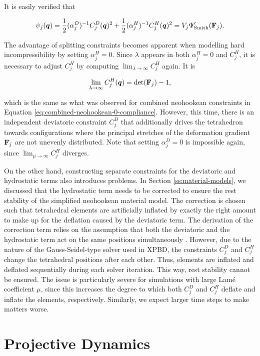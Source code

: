 \noindent It is easily verified that

\[
    \psi_j(\bm{q}) = \frac{1}{2}(\alpha^{D}_j)^{-1} C^D_j(\bm{q})^2 + \frac{1}{2}(\alpha^{H}_j)^{-1} C^H_j(\bm{q})^2 
    = V_j\Psi^\prime_{\text{Smith}}(\mathbf{F}_j).
\]

The advantage of splitting constraints becomes apparent when modelling hard incompressibility by setting $\alpha^H_j = 0$. Since $\lambda$ 
appears in both $\alpha^H_j = 0$ and $C^H_j$, it is necessary to adjust $C^H_j$ by computing $\lim_{\lambda\to\infty}C^H_j$ again. It is 

\[
    \lim_{\lambda\to\infty}C^H_j(\bm{q}) = \text{det}(\mathbf{F}_j) - 1,
\]

\noindent which is the same as what was observed for combined neohookean constraints in Equation \ref{eq:combined-neohookean-0-compliance}.
However, this time, there is an independent deviatoric constraint $C^D_j$ that additionally drives the tetrahedron towards configurations 
where the principal stretches of the deformation gradient $\mathbf{F}_j$ are not unevenly distributed. Note that setting $\alpha^D_j = 0$ is 
impossible again, since $\lim_{\mu\to\infty}C^H_j$ diverges.

On the other hand, constructing separate constraints for the deviatoric and hydrostatic terms also introduces problems. In 
Section \ref{ss:material-models},
we discussed that the hydrostatic term needs to be corrected to ensure the rest stability of the simplified neohookean material model. The 
correction is chosen such that tetrahedral elements are artificially inflated by exactly the right amount to make up for the deflation caused 
by the deviatoric term. The derivation of the correction term relies on the assumption that both the deviatoric and the hydrostatic term act 
on the same positions simultaneously \cite{smith2018}. However, due to the nature of the Gauss-Seidel-type solver used in XPBD, the constraints 
$C^D_j$ and $C^H_j$ change the tetrahedral positions after each other. Thus, elements are inflated and deflated sequentially during each solver 
iteration. This way, rest stability cannot be ensured. The issue is particularly severe for simulations with large Lamé coefficient $\mu$, 
since this increases the degree to which both $C^D_j$ and $C^H_j$ deflate and inflate the elements, respectively. Similarly, we expect 
larger time steps to make matters worse.

\section{Projective Dynamics}\label{s:pd}


